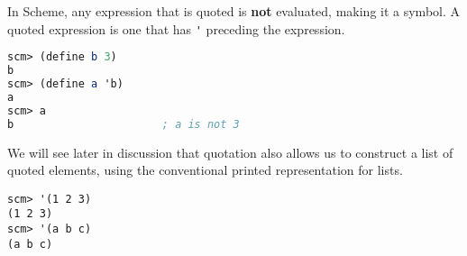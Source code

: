 In Scheme, any expression that is quoted is \textbf{not} evaluated, making it a symbol. A
quoted expression is one that has \lstinline{'} preceding the expression.

\begin{blocksection}
\begin{lstlisting}[language=Scheme]
scm> (define b 3)
b
scm> (define a 'b)
a
scm> a
b                       ; a is not 3
\end{lstlisting}
\end{blocksection}

We will see later in discussion that quotation also allows us to construct a
list of quoted elements, using the conventional printed representation for
lists.

\begin{blocksection}
\begin{lstlisting}
scm> '(1 2 3)
(1 2 3)
scm> '(a b c)
(a b c)
\end{lstlisting}
\end{blocksection}
